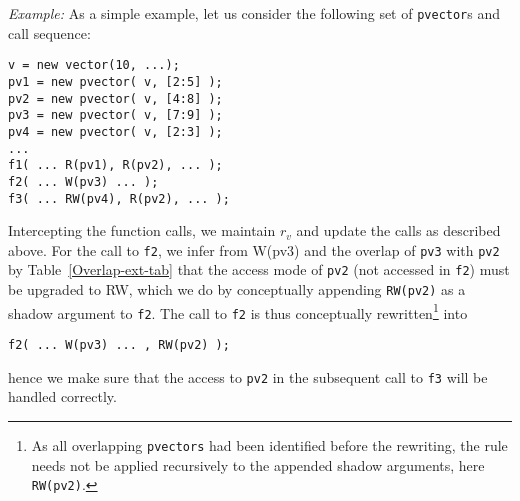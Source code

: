 \documentclass[preprint,12pt]{elsarticle}
\newcommand{\TODO}[1]{\textcolor{red}{\textbf{[TODO:#1]}}}
\newenvironment{example}{\smallskip\par\noindent\emph{Example:}}{\medskip}
\begin{document}
\begin{example}
As a simple example, let us consider the following set of \texttt{pvector}s and call sequence:

\begin{verbatim}
v = new vector(10, ...);
pv1 = new pvector( v, [2:5] );
pv2 = new pvector( v, [4:8] );
pv3 = new pvector( v, [7:9] );
pv4 = new pvector( v, [2:3] );
...
f1( ... R(pv1), R(pv2), ... );
f2( ... W(pv3) ... );  
f3( ... RW(pv4), R(pv2), ... );
\end{verbatim}

Intercepting the function calls, we maintain $r_v$ and update the calls as 
described above.
For the call to \verb.f2., we infer from W(pv3) and the overlap of \verb.pv3. with \verb.pv2.
by Table~\ref{Overlap-ext-tab} that the access mode of \verb.pv2. (not accessed in \verb.f2.) must be 
upgraded to RW, which we do by conceptually appending \verb.RW(pv2).
as a shadow argument to \verb.f2.. The call to \verb.f2. is thus
conceptually rewritten\footnote{As all overlapping
\texttt{pvectors} had been identified before the rewriting, the rule needs
not be applied recursively to the appended shadow arguments, here \texttt{RW(pv2)}.} into

\begin{verbatim}
f2( ... W(pv3) ... , RW(pv2) ); 
\end{verbatim}

\noindent
hence we make sure that the access to \verb.pv2. in the subsequent
call to \verb.f3. will be handled correctly.
\end{example} 

 
\end{document}
